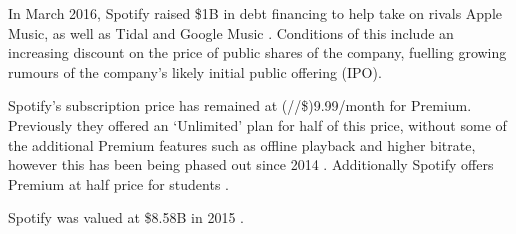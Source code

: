 In March 2016, Spotify raised \$1B in debt financing to help take on rivals Apple Music, as well as Tidal and Google Music \parencite{Reynolds2016}. Conditions of this include an increasing discount on the price of public shares of the company, fuelling growing rumours of the company's likely initial public offering (IPO).

Spotify's subscription price has remained at (\textsterling/\EUR{}/\$)9.99/month for Premium. Previously they offered an `Unlimited' plan for half of this price, without some of the additional Premium features such as offline playback and higher bitrate, however this has been being phased out since 2014 \parencite{Fisque2013}. Additionally Spotify offers Premium at half price for students \parencite{Spotify2016c}.

Spotify was valued at \$8.58B in 2015 \parencite{Davidson2015}.